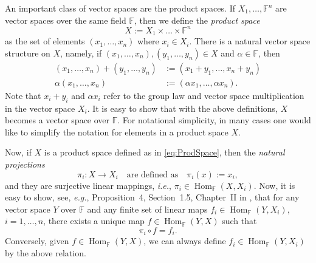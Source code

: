 \documentclass[a4paper]{paper}
\newcommand{\Field}{\mathbb{F}}
\DeclareMathOperator{\Hom}{Hom}
\newcommand{\ie}{\textsl{i.e.}\xspace}
\newcommand{\eg}{\textsl{e.g.}\xspace}
\newcommand{\etc}{\textsl{e.t.c.}\xspace}
\newcommand{\vf}{\boldsymbol{f}}
\begin{document}
An important class of vector spaces are the product spaces. 
If $X_1, \ldots, \Field^{n}$ are  vector spaces over the same field $\Field$, then we
define the \emph{product space}
\begin{equation}\label{eq:ProdSpace}
   X:= X_1 \times \ldots  \times \Field^{n} 
\end{equation}
as the set of elements $(x_1,\ldots,x_{n})$ where $x_i\in X_i$. There is a natural vector 
space structure on $X$, namely, if $(x_1,\ldots,x_{n}), (y_1,\ldots,y_{n})\in X$ and 
$\alpha\in\Field$, then 
\begin{align*}
   (x_1,\ldots,x_{n})+(y_1,\ldots,y_{n}) &:= (x_1+y_1,\ldots,x_{n}+y_{n}) \\
   \alpha (x_1,\ldots,x_{n}) &:= (\alpha x_1,\ldots,\alpha x_{n}).
\end{align*}
Note that $x_i+y_i$ and $\alpha x_i$ refer to the group law and vector space 
multiplication in the vector space $X_i$. It is easy to show that with the above definitions, 
$X$ becomes a vector space over $\Field$. 
For notational simplicity, in many cases one would like to simplify the notation for
elements in a product space $X$. 

Now, if $X$ is a product space defined as in \eqref{eq:ProdSpace}, then the 
\emph{natural projections}
\[ \pi_i \colon X \to X_i \quad\text{are defined as}\quad \pi_i(x):=x_i, \]
and they are surjective linear mappings, \ie, $\pi_i\in\Hom_{\Field}(X,X_i)$. 
Now, it is easy to show, see, \eg, Proposition~4, Section~1.5, Chapter~II in \cite{Bo89}, 
that for any vector space $Y$ over $\Field$ and any finite set of linear maps 
$f_i \in \Hom_{\Field}(Y,X_i)$,  $i=1,\ldots,n$, there exists a unique map 
$f\in \Hom_{\Field}(Y,X)$ such that 
\[ \pi_i \circ f = f_i. \]
Conversely, given $f\in \Hom_{\Field}(Y,X)$, we can always define $f_i \in \Hom_{\Field}(Y,X_i)$ by 
the above relation. 
\end{document}
